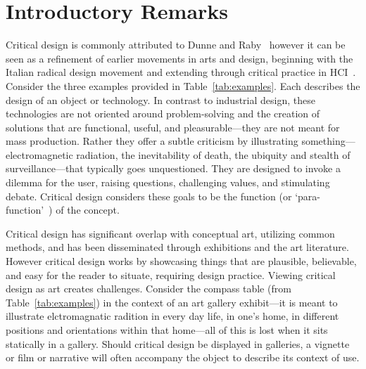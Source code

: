 
\section{Introductory Remarks}



Critical design is commonly attributed to Dunne and Raby~\cite{DuRa01,Dun05} however it can be seen as a refinement of earlier movements in arts and design, beginning with the Italian radical design movement and extending through critical practice in HCI~\cite{Mal17}. Consider the three examples provided in Table~\ref{tab:examples}. Each describes the design of an object or technology. In contrast to industrial design, these technologies are not oriented around problem-solving and the creation of solutions that are functional, useful, and pleasurable---they are not meant for mass production. Rather they offer a subtle criticism by illustrating something---electromagnetic radiation, the inevitability of death, the ubiquity and stealth of surveillance---that typically goes unquestioned. They are designed to invoke a dilemma for the user, raising questions, challenging values, and stimulating debate. Critical design considers these goals to be the function (or `para-function'~\cite{Dun05}) of the concept. %

Critical design has significant overlap with conceptual art, utilizing common methods, and has been disseminated through exhibitions and the art literature. However critical design works by showcasing things that are plausible, believable, and easy for the reader to situate, requiring design practice. Viewing critical design as art creates challenges. Consider the compass table (from Table~\ref{tab:examples}) in the context of an art gallery exhibit---it is meant to illustrate elctromagnatic radition in every day life, in one's home, in different positions and orientations within that home---all of this is lost when it sits statically in a gallery. Should critical design be displayed in galleries, a vignette or film or narrative will often accompany the object to describe its context of use.

